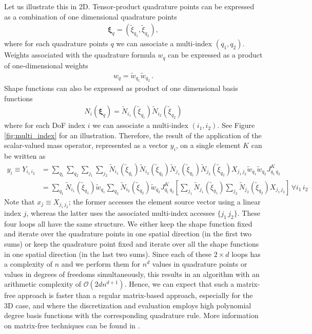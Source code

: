 \documentclass[times,doublespace]{nmeauth}
\def\gz  #1{           \mbox{$\boldsymbol{#1}$}}
\begin{document}
Let us illustrate this in 2D. Tensor-product quadrature points can be expressed as a combination of one dimensional quadrature points
\begin{align}
  \gz \xi_q = (\widetilde{\xi}_{q_1}, \widetilde{\xi}_{q_2}),
\end{align}
where for each quadrature points $q$ we can associate a multi-index $(q_1,q_2)$.
Weights associated with the quadrature formula $w_q$ can be expressed as a product of one-dimensional weights
\begin{align}
  w_q = \widetilde{w}_{q_1} \widetilde{w}_{q_2} \, .
\end{align}
Shape functions can also be expressed as product of one dimensional basis functions
\begin{align}
  N_i(\gz \xi_q) =
  \widetilde{N}_{i_1}(\widetilde{\xi}_{q_1})
  \widetilde{N}_{i_2}(\widetilde{\xi}_{q_2})
\end{align}
where for each DoF index $i$ we can associate a multi-index $(i_1, i_2)$.
{\color{red}
See Figure \ref{fig:multi_index} for an illustration.
}
%
Therefore, the result of the application of the scalar-valued mass operator, represented as a vector $y_i$, on a single element $K$ can be written as
\begin{align*}
  y_{i} \equiv Y_{i_1\,i_2} & = \sum_{q_1} \sum_{q_2} \sum_{j_1} \sum_{j_2}
  \widetilde{N}_{i_1}(\widetilde{\xi}_{q_1})
  \widetilde{N}_{i_2}(\widetilde{\xi}_{q_2})
  \widetilde{N}_{j_1}(\widetilde{\xi}_{q_1})
  \widetilde{N}_{j_2}(\widetilde{\xi}_{q_2})
  X_{j_1\,j_2}
  \widetilde{w}_{q_1} \widetilde{w}_{q_2} J^K_{q_1\,q_2}
  \\
  &=
  \sum_{q_1} \widetilde{N}_{i_1}(\widetilde{\xi}_{q_1}) \widetilde{w}_{q_1}
  \sum_{q_2} \widetilde{N}_{i_2}(\widetilde{\xi}_{q_2}) \widetilde{w}_{q_2}
  J^K_{q_1\,q_2}
  \left[
    \sum_{j_1}
    \widetilde{N}_{j_1}(\widetilde{\xi}_{q_1})
    \sum_{j_2}
    \widetilde{N}_{j_2}(\widetilde{\xi}_{q_2})
    X_{j_1\,j_2}
  \right]\, \forall i_1 \, i_2
\end{align*}
%
{\color{red}
Note that $x_j \equiv X_{j_1\,j_2}$; the former accesses the element source vector using a linear index $j$, whereas the latter uses the associated multi-index accesses $\{j_1\,j_2\}$.
}
%
These four loops all have the same structure.
We either keep the shape function fixed and iterate over the quadrature points in one spatial direction (in the first two sums) or keep the quadrature point fixed and iterate over all the shape functions in one spatial direction (in the last two sums).
Since each of these $2\times d$ loops has a complexity of $n$ and we perform them for $n^d$ values in quadrature points or values in degrees of freedoms simultaneously, this results in an algorithm with an arithmetic complexity of $\mathcal{O}(2dn^{d+1})$.
Hence, we can expect that such a matrix-free approach is faster than a regular matrix-based approach, especially for the 3D case, and where the discretization and evaluation employs high polynomial degree basis functions with the corresponding quadrature rule.
More information on matrix-free techniques can be found in \cite{kronbichler12,vos10}.
\end{document}
